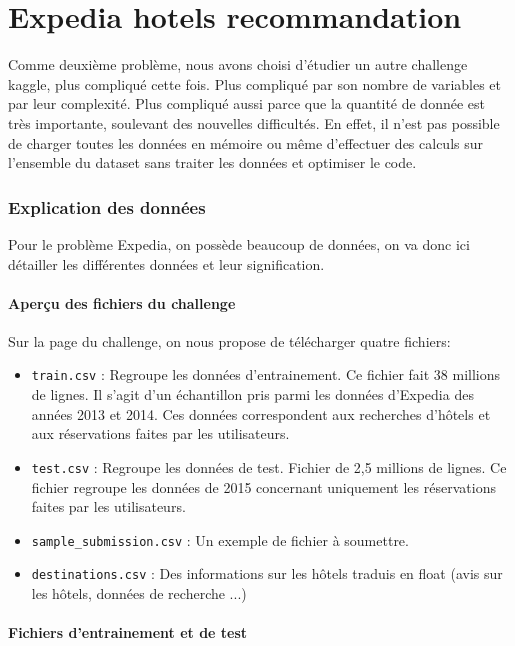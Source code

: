 \part{Expedia hotels recommandation}

Comme deuxième problème, nous avons choisi d'étudier un autre challenge kaggle, plus compliqué cette fois. Plus compliqué par son nombre de variables et par leur complexité. Plus compliqué aussi parce que la quantité de donnée est très importante, soulevant des nouvelles difficultés. En effet, il n'est pas possible de charger toutes les données en mémoire ou même d'effectuer des calculs sur l'ensemble du dataset sans traiter les données et optimiser le code.

\section{Explication des données}

Pour le problème Expedia, on possède beaucoup de données, on va donc ici détailler les différentes données et leur signification.

\subsection{Aperçu des fichiers du challenge}

Sur la page du challenge, on nous propose de télécharger quatre fichiers:

\begin{itemize}[label=$\circ$]
	\item \verb|train.csv| : Regroupe les données d'entrainement. Ce fichier fait 38 millions de lignes. Il s'agit d'un échantillon pris parmi les données d'Expedia des années 2013 et 2014. Ces données correspondent aux recherches d'hôtels et aux réservations faites par les utilisateurs.
	\item \verb|test.csv| : Regroupe les données de test. Fichier de 2,5 millions de lignes. Ce fichier regroupe les données de 2015 concernant uniquement les réservations faites par les utilisateurs.
	\item \verb|sample_submission.csv| : Un exemple de fichier à soumettre.
	\item \verb|destinations.csv| : Des informations sur les hôtels traduis en float (avis sur les hôtels, données de recherche ...)
\end{itemize}

\subsection{Fichiers d'entrainement et de test}

